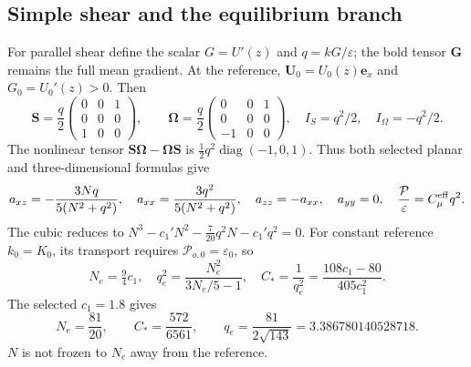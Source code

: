 \documentclass[11pt,a4paper]{article}
\numberwithin{equation}{section}
\newcommand{\eps}{\varepsilon}
\newcommand{\diag}{\operatorname{diag}}
\begin{document}
\subsection{Simple shear and the equilibrium branch}
For parallel shear define the scalar $G=U'(z)$ and $q=kG/\eps$;
the bold tensor $\bm G$ remains the full mean gradient. At the reference,
$\bm U_0=U_0(z)\bm e_x$ and $G_0=U_0'(z)>0$. Then
\begin{equation}
 \bm S=\frac q2
 \begin{pmatrix}0&0&1\\0&0&0\\1&0&0\end{pmatrix},\qquad
 \bm\Omega=\frac q2
 \begin{pmatrix}0&0&1\\0&0&0\\-1&0&0\end{pmatrix},
 \quad I_S=q^2/2,\quad I_\Omega=-q^2/2.
 \label{eq:simple-shear}
\end{equation}
The nonlinear tensor $\bm S\bm\Omega-\bm\Omega\bm S$
is $\tfrac12q^2\diag(-1,0,1)$.
Thus both selected planar and three-dimensional formulas give
\begin{equation}
 a_{xz}=-\frac{3Nq}{5(N^2+q^2)},\quad
 a_{xx}=\frac{3q^2}{5(N^2+q^2)},\quad
 a_{zz}=-a_{xx},\quad a_{yy}=0,\quad
 \frac{\mathcal P}{\eps}=C_\mu^{\rm eff}q^2.
 \label{eq:shear-stress}
\end{equation}
The cubic reduces to
$N^3-c_1'N^2-\tfrac7{20}q^2N-c_1'q^2=0$.
For constant reference $k_0=K_0$, its transport requires
$\mathcal P_{o,0}=\eps_0$, so
\begin{equation}
 \boxed{
 N_e=\tfrac94c_1,\quad
 q_e^2=\frac{N_e^2}{3N_e/5-1},\quad
 C_*=\frac1{q_e^2}=\frac{108c_1-80}{405c_1^2}.}
 \label{eq:equilibrium-constants}
\end{equation}
The selected $c_1=1.8$ gives
\begin{equation}
 N_e=\frac{81}{20},\qquad C_*=\frac{572}{6561},\qquad
 q_e=\frac{81}{2\sqrt{143}}=3.386780140528718.
 \label{eq:exact-root}
\end{equation}
$N$ is not frozen to $N_e$ away from the reference.
\end{document}
